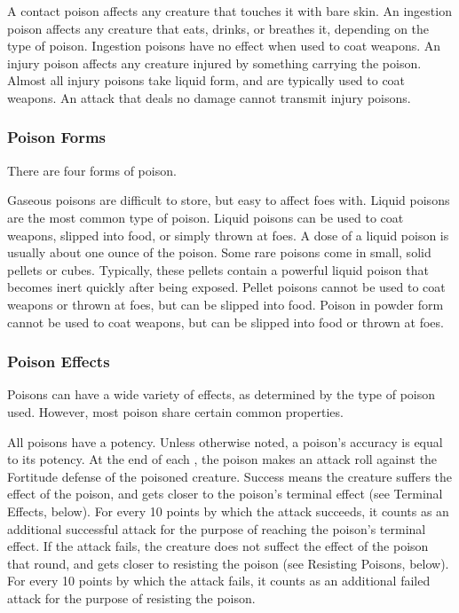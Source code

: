              A contact poison affects any creature that touches it with bare skin.
             An ingestion poison affects any creature that eats, drinks, or breathes it, depending on the type of poison.
            Ingestion poisons have no effect when used to coat weapons.
             An injury poison affects any creature injured by something carrying the poison.
            Almost all injury poisons take liquid form, and are typically used to coat weapons.
            An attack that deals no damage cannot transmit injury poisons.

        \subsubsection{Poison Forms}\label{Poison Forms}

            There are four forms of poison.

             Gaseous poisons are difficult to store, but easy to affect foes with.
             Liquid poisons are the most common type of poison.
            Liquid poisons can be used to coat weapons, slipped into food, or simply thrown at foes.
            A dose of a liquid poison is usually about one ounce of the poison.
             Some rare poisons come in small, solid pellets or cubes.
            Typically, these pellets contain a powerful liquid poison that becomes inert quickly after being exposed.
            Pellet poisons cannot be used to coat weapons or thrown at foes, but can be slipped into food.
             Poison in powder form cannot be used to coat weapons, but can be slipped into food or thrown at foes.

        \subsubsection{Poison Effects}\label{Poison Effects}

            Poisons can have a wide variety of effects, as determined by the type of poison used.
            However, most poison share certain common properties.

            \label{Potency}\label{Poison Potency}
            All poisons have a potency.
            Unless otherwise noted, a poison's accuracy is equal to its potency.
            At the end of each , the poison makes an attack roll against the Fortitude defense of the poisoned creature.
            Success means the creature suffers the effect of the poison, and gets closer to the poison's terminal effect (see Terminal Effects, below).
            For every 10 points by which the attack succeeds, it counts as an additional successful attack for the purpose of reaching the poison's terminal effect.
            If the attack fails, the creature does not suffect the effect of the poison that round, and gets closer to resisting the poison (see Resisting Poisons, below).
            For every 10 points by which the attack fails, it counts as an additional failed attack for the purpose of resisting the poison.

